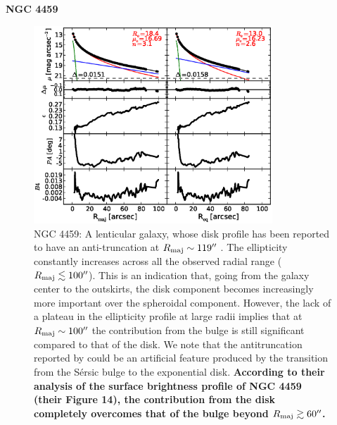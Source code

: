 \documentclass[preprint2]{emulateapj}
\newcommand{\fitfigurewidth}{0.8\textwidth}
\begin{document}
  \clearpage\newpage\noindent
  {\bf NGC 4459 \\}

  \begin{figure}[h]
  \begin{center}
  \includegraphics[width=\fitfigurewidth]{images/n4459_1Dfit.eps}
  \caption{NGC 4459: 
  A lenticular galaxy, 
  whose disk profile has been reported to have an anti-truncation at $R_{\rm maj} \sim 119''$ \citep{gutierrez2011}.
  The ellipticity constantly increases across all the observed radial range ($R_{\rm maj} \lesssim 100''$).
  This is an indication that, going from the galaxy center to the outskirts,
  the disk component becomes increasingly more important over the spheroidal component.
  However, the lack of a plateau in the ellipticity profile at large radii implies that at $R_{\rm maj} \sim 100''$ 
  the contribution from the bulge is still significant compared to that of the disk.
  We note that the antitruncation reported by \cite{gutierrez2011} could be an artificial feature 
  produced by the transition from the S\'ersic bulge to the exponential disk. 
  {\bf According to their analysis of the surface brightness profile of NGC 4459 (their Figure 14), 
  the contribution from the disk completely overcomes that of the bulge beyond $R_{\rm maj} \gtrsim 60''$. 
}}
\end{center}
\end{figure}
\end{document}
